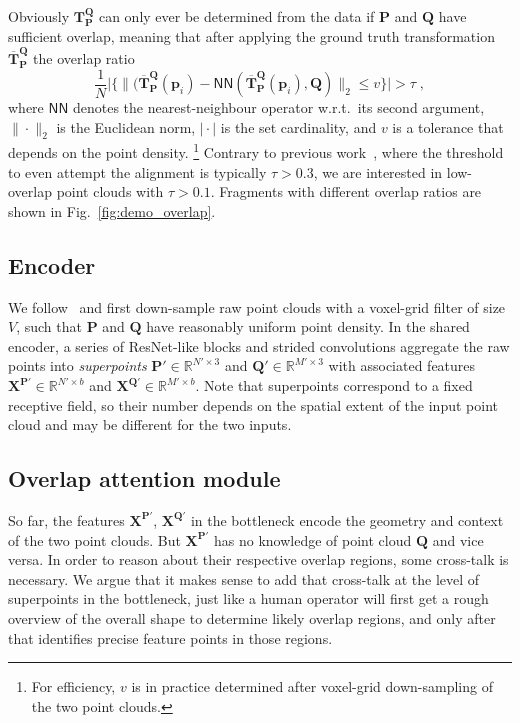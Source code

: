 Obviously $\mathbf{T}_\mathbf{P}^\mathbf{Q}$ can only ever be determined from the data if $\mathbf{P}$ and $\mathbf{Q}$ have sufficient overlap, meaning that after applying the ground truth transformation $\overbar{\mathbf{T}}_\mathbf{P}^\mathbf{Q}$ the overlap ratio
\begin{equation}
 \frac{1}{N}\big|\big\{\|(\overbar{\mathbf{T}}_\mathbf{P}^ \mathbf{Q}(\mathbf{p}_i)-\mathsf{NN}(\overbar{\mathbf{T}}_\mathbf{P}^\mathbf{Q}(\mathbf{p}_i),\mathbf{Q})\|_2%
 \leq v\big\}\big|>\tau\;,
    \label{eq:overlap_ratio}
\end{equation}
where $\mathsf{NN}$ denotes the nearest-neighbour operator w.r.t.\ its second argument, $\|\!\cdot\!\|_2$ is the Euclidean norm, $|\!\cdot\!|$ is the set cardinality, and $v$ is a tolerance that depends on the point density.%
\footnote{For efficiency, $v$ is in practice determined after voxel-grid down-sampling of the two point clouds.} %
Contrary to previous work~\cite{zeng20163dmatch,khoury2017CGF}, where the threshold to even attempt the alignment is typically $\tau\!>\!0.3$, we are interested in low-overlap point clouds with $\tau\!>\!0.1$. Fragments with different overlap ratios are shown in Fig.~\ref{fig:demo_overlap}.


\subsection{Encoder}
\label{sec:method_encoder}
We follow~\cite{thomas2019kpconv} and first down-sample raw point clouds with a voxel-grid filter of size $V$, such that
$\mathbf{P}$ and $\mathbf{Q}$ have reasonably uniform point density.
In the shared encoder, a series of ResNet-like blocks and strided convolutions aggregate the raw points into \textit{superpoints} $\mathbf{P}'\in\mathbb{R}^{N'\times 3}$ and 
$\mathbf{Q}'\in\mathbb{R}^{M'\times 3}$ with associated features $\mathbf{X}^{\mathbf{P}'} \in \mathbb{R}^{N{'} \times b}$ and $\mathbf{X}^{\mathbf{Q}'} \in \mathbb{R}^{M' \times b}$.
Note that superpoints correspond to a fixed receptive field, so their number depends on the spatial extent of the input point cloud and may be different for the two inputs.

\subsection{Overlap attention module}
\label{sec:method_overlap_attention}
So far, the features $\mathbf{X}^{\mathbf{P}'}$, $\mathbf{X}^{\mathbf{Q}'}$ in the bottleneck encode the geometry and context of the two point clouds. But $\mathbf{X}^{\mathbf{P}'}$ has no knowledge of point cloud $\mathbf{Q}$ and vice versa.
In order to reason about their respective overlap regions, some cross-talk is necessary.
We argue that it makes sense to add that cross-talk at the level of superpoints in the bottleneck, just like a human operator will first get a rough overview of the overall shape to determine likely overlap regions, and only after that identifies precise feature points in those regions.

